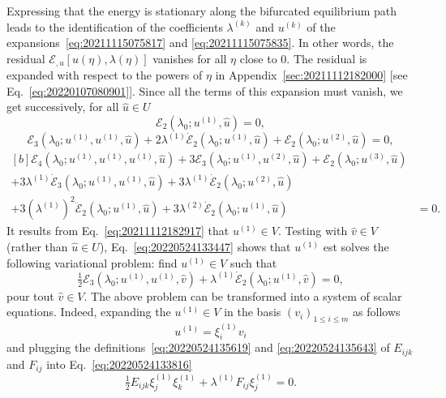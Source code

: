 \documentclass[12pt, final]{scrartcl}
\theoremstyle{definition}
\newcommand{\E}{\mathcal E}
\newcommand{\order}[2][1]{#2^{(#1)}}
\begin{document}
Expressing that the energy is stationary along the bifurcated equilibrium path
leads to the identification of the coefficients $\order[k]\lambda$ and
$\order[k]u$ of the expansions~\eqref{eq:20211115075817} and
\eqref{eq:20211115075835}. In other words, the residual $\E_{, u} [u(η), \lambda(η)]$
vanishes for all $η$ close to $0$. The residual is expanded with respect to
the powers of $η$ in Appendix~\ref{sec:20211112182000} [see
Eq.~\eqref{eq:20220107080901}]. Since all the terms of this expansion must
vanish, we get successively, for all $\hat{u} \in U$
\begin{equation}
  \label{eq:20211112182917}
  \E_2(\lambda_0; \order[1]u, \hat{u}) = 0,
\end{equation}
\begin{equation}
  \label{eq:20220524133447}
  \E_3(\lambda_0; \order[1]u, \order[1]u, \hat{u}) + 2\order[1]\lambda\dot{\E}_2(\lambda_0; \order[1]u, \hat{u}) + \E_2(\lambda_0; \order[2]u, \hat{u}) = 0,
\end{equation}
\begin{equation}
  \label{eq:20220708060436}
  \begin{aligned}[b]
    \E_4(\lambda_0; \order[1]u, \order[1]u, \order[1]u, \hat{u}) + 3\E_3(\lambda_0; \order[1]u, \order[2]u, \hat{u}) + \E_2(\lambda_0; \order[3]u, \hat{u})&\\
    + 3\order[1]\lambda\dot{\E}_3(\lambda_0; \order[1]u, \order[1]u, \hat{u}) + 3\order[1]\lambda\dot{\E}_2(\lambda_0;  \order[2]u, \hat{u})&\\
    + 3(\order[1]\lambda)^2\ddot{\E}_2(\lambda_0; \order[1]u, \hat{u}) + 3\order[2]\lambda\dot{\E}_2(\lambda_0; \order[1]u, \hat{u}) & = 0.
  \end{aligned}
\end{equation}
It results from Eq.~\eqref{eq:20211112182917} that $\order[1]u \in V$. Testing
with $\hat{v} \in V$ (rather than $\hat{u} \in U$),
Eq.~\eqref{eq:20220524133447} shows that $\order[1]u$ est solves the following
variational problem: find $\order[1]u \in V$ such that
\begin{equation}
  \label{eq:20220524133816}
  \tfrac{1}{2} \E_3(\lambda_0; \order[1]u, \order[1]u, \hat{v}) + \order[1]\lambda\dot{\E}_2(\lambda_0; \order[1]u, \hat{v}) = 0,
\end{equation}
pour tout $\hat{v} \in V$. The above problem can be transformed into a system of
scalar equations. Indeed, expanding the $\order[1]u \in V$ in the basis
$(v_i)_{1 ≤ i ≤ m}$ as follows
\begin{equation}
  \label{eq:20220524133944}
  \order[1]u = \order[1]{ξ_i} v_i
\end{equation}
and plugging the definitions~\eqref{eq:20220524135619} and
\eqref{eq:20220524135643} of $E_{ijk}$ and $F_{ij}$ into
Eq.~\eqref{eq:20220524133816}
\begin{equation}
  \label{eq:20220524135036}
  \tfrac{1}{2} E_{ijk} \order[1]{ξ_j} \order[1]{ξ_k} + \order[1]\lambda F_{ij} \order[1]{ξ_j} = 0.
\end{equation}
\end{document}
